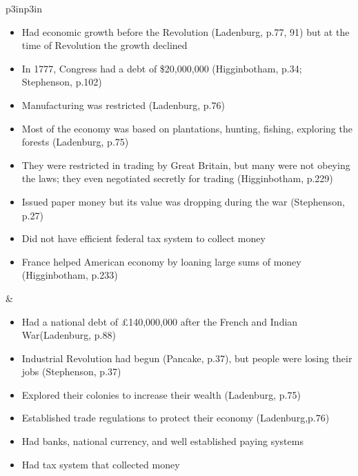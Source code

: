 \begin{singlespace}
\begin{mpxtabular}{p{3in}p{3in}}
\begin{itemize}[nolistsep,leftmargin=*]
	     \item Had economic growth before the Revolution (Ladenburg, p.77, 91) but at the time of Revolution the growth declined
	     \item In 1777, Congress had a debt of \$20,000,000 (Higginbotham, p.34; Stephenson, p.102)
	     \item Manufacturing was restricted (Ladenburg, p.76)
	     \item Most of the economy was based on plantations, hunting, fishing, exploring the forests (Ladenburg, p.75) 
	     \item They were restricted in trading by Great Britain, but many were not obeying the laws; they even negotiated secretly for trading (Higginbotham, p.229)
	     \item Issued paper money but its value  was dropping during the war (Stephenson, p.27)
	     \item Did not have efficient federal tax system to collect money 
	     \item France helped American economy by loaning large sums of money (Higginbotham, p.233)
	\end{itemize}
	&
	\begin{itemize}[nolistsep,leftmargin=*]
	    \item Had a national debt of £140,000,000 after the French and Indian War(Ladenburg, p.88) 
	    \item Industrial Revolution had begun (Pancake, p.37), but people were losing their jobs (Stephenson, p.37) 
	    \item Explored their colonies to increase their wealth (Ladenburg, p.75) 
	    \item Established trade regulations to protect their economy (Ladenburg,p.76) 
	    \item Had banks, national currency, and well established paying systems 
	    \item Had tax system that collected money 
	\end{itemize}\ML
      \end{mpxtabular}
\end{singlespace}
%
